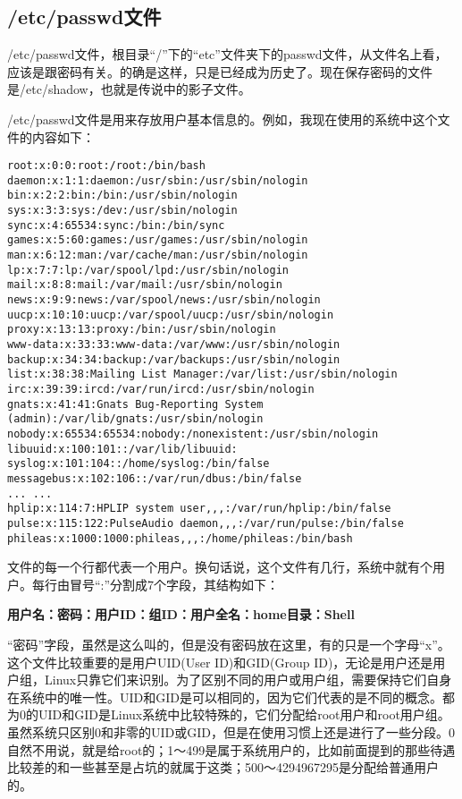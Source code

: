 {\newpage
\subsection{/etc/passwd文件}
/etc/passwd文件，根目录“/”下的“etc”文件夹下的passwd文件，从文件名上看，应该是跟密码有关。的确是这样，只是已经成为历史了。现在保存密码的文件是/etc/shadow，也就是传说中的影子文件。

/etc/passwd文件是用来存放用户基本信息的。例如，我现在使用的系统中这个文件的内容如下：
\begin{verbatim}
root:x:0:0:root:/root:/bin/bash
daemon:x:1:1:daemon:/usr/sbin:/usr/sbin/nologin
bin:x:2:2:bin:/bin:/usr/sbin/nologin
sys:x:3:3:sys:/dev:/usr/sbin/nologin
sync:x:4:65534:sync:/bin:/bin/sync
games:x:5:60:games:/usr/games:/usr/sbin/nologin
man:x:6:12:man:/var/cache/man:/usr/sbin/nologin
lp:x:7:7:lp:/var/spool/lpd:/usr/sbin/nologin
mail:x:8:8:mail:/var/mail:/usr/sbin/nologin
news:x:9:9:news:/var/spool/news:/usr/sbin/nologin
uucp:x:10:10:uucp:/var/spool/uucp:/usr/sbin/nologin
proxy:x:13:13:proxy:/bin:/usr/sbin/nologin
www-data:x:33:33:www-data:/var/www:/usr/sbin/nologin
backup:x:34:34:backup:/var/backups:/usr/sbin/nologin
list:x:38:38:Mailing List Manager:/var/list:/usr/sbin/nologin
irc:x:39:39:ircd:/var/run/ircd:/usr/sbin/nologin
gnats:x:41:41:Gnats Bug-Reporting System (admin):/var/lib/gnats:/usr/sbin/nologin
nobody:x:65534:65534:nobody:/nonexistent:/usr/sbin/nologin
libuuid:x:100:101::/var/lib/libuuid:
syslog:x:101:104::/home/syslog:/bin/false
messagebus:x:102:106::/var/run/dbus:/bin/false
... ...
hplip:x:114:7:HPLIP system user,,,:/var/run/hplip:/bin/false
pulse:x:115:122:PulseAudio daemon,,,:/var/run/pulse:/bin/false
phileas:x:1000:1000:phileas,,,:/home/phileas:/bin/bash
\end{verbatim}

文件的每一个行都代表一个用户。换句话说，这个文件有几行，系统中就有个用户。每行由冒号“:”分割成7个字段，其结构如下：

\centerline{\textbf{用户名：密码：用户ID：组ID：用户全名：home目录：Shell}}

“密码”字段，虽然是这么叫的，但是没有密码放在这里，有的只是一个字母“x”。这个文件比较重要的是用户UID(User ID)和GID(Group ID)，无论是用户还是用户组，Linux只靠它们来识别。为了区别不同的用户或用户组，需要保持它们自身在系统中的唯一性。UID和GID是可以相同的，因为它们代表的是不同的概念。都为0的UID和GID是Linux系统中比较特殊的，它们分配给root用户和root用户组。虽然系统只区别0和非零的UID或GID，但是在使用习惯上还是进行了一些分段。0自然不用说，就是给root的；1～499是属于系统用户的，比如前面提到的那些待遇比较差的和一些甚至是占坑的就属于这类；500～4294967295是分配给普通用户的。

}
